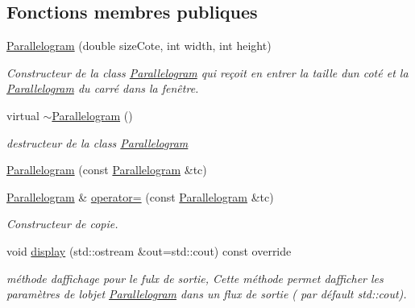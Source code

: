 \subsection*{Fonctions membres publiques}
\begin{DoxyCompactItemize}
\item 
\hyperlink{classgeometric_shape_1_1_parallelogram_ad65826d9cb438059b6c96e1326ade523}{Parallelogram} (double size\+Cote, int width, int height)
\begin{DoxyCompactList}\small\item\em Constructeur de la class \hyperlink{classgeometric_shape_1_1_parallelogram}{Parallelogram} qui reçoit en entrer la taille d\textquotesingle{}un coté et la \hyperlink{classgeometric_shape_1_1_parallelogram}{Parallelogram} du carré dans la fenêtre. \end{DoxyCompactList}\item 
\mbox{\label{classgeometric_shape_1_1_parallelogram_a41a2cf96ae46971e44b010114fb12b5f}} 
virtual \hyperlink{classgeometric_shape_1_1_parallelogram_a41a2cf96ae46971e44b010114fb12b5f}{$\sim$\+Parallelogram} ()
\begin{DoxyCompactList}\small\item\em destructeur de la class \hyperlink{classgeometric_shape_1_1_parallelogram}{Parallelogram} \end{DoxyCompactList}\item 
\hyperlink{classgeometric_shape_1_1_parallelogram_a170744d0daa3346a5e867ca4ed566fec}{Parallelogram} (const \hyperlink{classgeometric_shape_1_1_parallelogram}{Parallelogram} \&tc)
\item 
\hyperlink{classgeometric_shape_1_1_parallelogram}{Parallelogram} \& \hyperlink{classgeometric_shape_1_1_parallelogram_a3c408a16bc3c0e40e0c26fde2279a9b9}{operator=} (const \hyperlink{classgeometric_shape_1_1_parallelogram}{Parallelogram} \&tc)
\begin{DoxyCompactList}\small\item\em Constructeur de copie. \end{DoxyCompactList}\item 
void \hyperlink{classgeometric_shape_1_1_parallelogram_a3e9f220add215e8f594da75daf19a8c1}{display} (std\+::ostream \&out=std\+::cout) const override
\begin{DoxyCompactList}\small\item\em méthode d\textquotesingle{}affichage pour le fulx de sortie, Cette méthode permet d\textquotesingle{}afficher les paramètres de l\textquotesingle{}objet \hyperlink{classgeometric_shape_1_1_parallelogram}{Parallelogram} dans un flux de sortie ( par défault std\+::cout). \end{DoxyCompactList}\item 

\end{DoxyCompactItemize}
